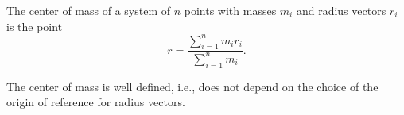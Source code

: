 The center of mass of a system of $n$ points with masses $m_i$ and radius vectors $r_i$ is the point
$$r = \frac{\sum_{i=1}^{n} m_i r_i}{\sum_{i=1}^{n} m_i}.$$

The center of mass is well defined, i.e., does not depend on the choice of the origin of reference for radius vectors.

